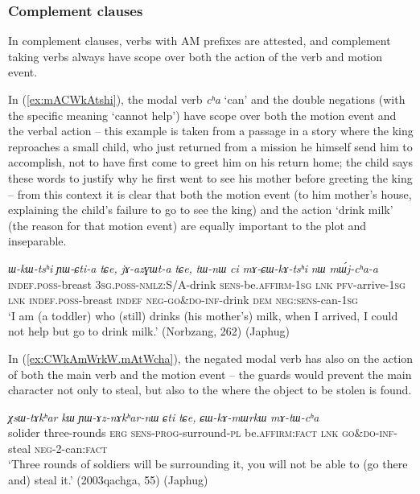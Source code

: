 \documentclass[oneside,a4paper,11pt]{article}
\newcommand{\ipa}[1]{{\phon\textit{#1}}}
\newcommand{\japhug}[2]{\textit{\phon#1} `#2'}
\newcommand{\rouge}[1]{{\color{red}#1}}
\begin{document}
\subsubsection{Complement clauses} \label{sec:am.conditional}
In complement clauses, verbs with AM prefixes are attested, and complement taking verbs always have scope over both the action of the verb and motion event.

 
In (\ref{ex:mACWkAtshi}), the modal verb \japhug{cʰa}{can} and the double negations (with the specific meaning `cannot help') have scope over both the motion event and the verbal action -- this example is taken from a passage in a story where the king reproaches a small child, who just returned from a mission he himself send him to accomplish, not to have first come to greet him on his return home; the child says these words to justify why he first went to see his mother before greeting the king -- from this context it is clear that both the motion event (to him mother's house, explaining the child's failure to go to see the king) and the action `drink milk' (the reason for that motion event) are equally important to the plot and inseparable. 

\begin{exe}
\ex \label{ex:mACWkAtshi}
\gll  \ipa{tɯ-nɯ}	\ipa{ɯ-kɯ-tsʰi}	\ipa{ɲɯ-ɕti-a}	\ipa{tɕe,}	\ipa{jɤ-azɣɯt-a}	\ipa{tɕe,}	\ipa{tɯ-nɯ}	\ipa{ci}	\ipa{mɤ-\rouge{ɕɯ}-kɤ-tsʰi}	\ipa{nɯ}	\ipa{mɯ́j-cʰa-a}  \\
\textsc{indef}.\textsc{poss}-breast \textsc{3sg}.\textsc{poss}-\textsc{nmlz}:S/A-drink \textsc{sens}-be.\textsc{affirm}-\textsc{1sg} \textsc{lnk} \textsc{pfv}-arrive-\textsc{1sg} \textsc{lnk} \textsc{indef}.\textsc{poss}-breast  \textsc{indef} \textsc{neg}-\rouge{\textsc{go\&do}}-\textsc{inf}-drink \textsc{dem} \textsc{neg}:\textsc{sens}-can-\textsc{1sg} \\
\glt `I am (a toddler) who (still) drinks (his mother's) milk, when I arrived, I could not help but go to drink milk.'  (Norbzang, 262) (Japhug)
 \end{exe}
 
 In (\ref{ex:CWkAmWrkW.mAtWcha}), the negated modal verb has also on the action of both the main verb and the motion event -- the guards would prevent the main character not only to steal, but also to the where the object to be stolen is found.
 
\begin{exe}
\ex \label{ex:CWkAmWrkW.mAtWcha}
\gll \ipa{ʁmaʁ}	\ipa{χsɯ-tɤkʰar}	\ipa{kɯ}	\ipa{ɲɯ-ɤz-nɤkʰar-nɯ}	\ipa{ɕti}	\ipa{tɕe,}	\ipa{\rouge{ɕɯ}-kɤ-mɯrkɯ}	\ipa{mɤ-tɯ-cʰa}  \\
solider three-rounds \textsc{erg} \textsc{sens}-\textsc{prog}-surround-\textsc{pl} be.\textsc{affirm}:\textsc{fact} \textsc{lnk}  \rouge{\textsc{go\&do}}-\textsc{inf}-steal \textsc{neg}-2-can:\textsc{fact} \\
\glt `Three rounds of soldiers will be surrounding it, you will not be able to (go there and) steal it.' (2003qachga, 55) (Japhug)
   \end{exe}
 
\end{document}
